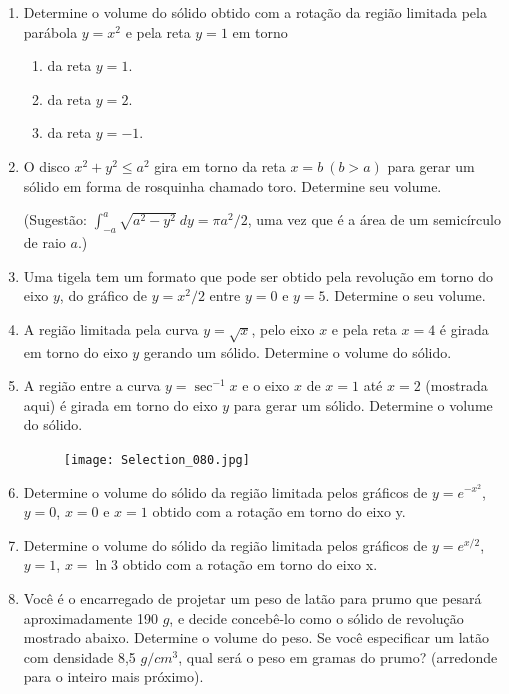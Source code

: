 \documentclass[11pt,a4paper]{article}
\begin{document}
\begin{enumerate}
\item Determine o volume do sólido obtido com a rotação da região limitada pela parábola $y = x^2$ e pela reta $y = 1$ em torno
	\begin{enumerate}
	\item da reta $y = 1$.
	\item da reta $y = 2$.
	\item da reta $y = -1$.
	\end{enumerate}	
	
	\item O disco $x^2 + y^2 \leq a^2$ gira em torno da reta $x = b \ (b > a)$ para gerar um sólido em forma de rosquinha chamado toro. Determine seu volume. 
	
	(Sugestão: $\displaystyle\int_{-a}^{a} \sqrt{a^2 - y^2} \ dy = \pi a^2/2$, uma vez que é a área de um semicírculo de raio $a$.)
	
	\item Uma tigela tem um formato que pode ser obtido pela revolução em torno do eixo $y$, do gráfico de $y = x^2/2$ entre $y = 0$ e $y = 5$. Determine o seu volume.
      
	 \item A região limitada pela curva $y = \sqrt{x}$, pelo eixo $x$ e pela reta $x = 4$ é girada em torno do eixo $y$ gerando um sólido. Determine o volume do sólido.       
     
	\item A região entre a curva $y = \sec ^{-1} x$ e o eixo $x$ de $x = 1$ até $x = 2$ (mostrada aqui) é girada em torno do eixo $y$ para gerar um sólido. Determine o volume do sólido. 
     
    \begin{figure}[h]	
	\centering %
	\texttt{[image: Selection\_080.jpg]} 
	\end{figure} 
	
	\item Determine o volume do sólido da região limitada pelos gráficos de $y = e^{-x^2}$, $y = 0$, $x = 0$ e $x = 1$ obtido com a rotação em torno do eixo y.
	
	\item Determine o volume do sólido da região limitada pelos gráficos de $y = e^{x/2}$, $y = 1$, $x = \ln 3$ obtido com a rotação em torno do eixo x.
     
     \item Você é o encarregado de projetar um peso de latão para prumo que pesará aproximadamente 190 $g$, e decide concebê-lo como o sólido de revolução mostrado abaixo. Determine o volume do peso. Se você especificar um latão com densidade 8,5 $g/cm^3$, qual será o peso em gramas do prumo? (arredonde para o inteiro mais próximo). 
     

\end{enumerate}
\end{document}
